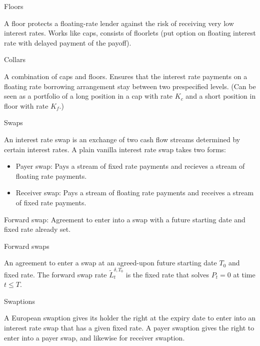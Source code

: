 \begin{description}
\item[Floors] 
\end{description}
A floor protects a floating-rate lender against the risk of receiving very low interest
rates. Works like caps, consists of floorlets (put option on floating interest rate with delayed
payment of the payoff).

\begin{description}
\item[Collars] 
\end{description}
A combination of caps and floors. Ensures that the interest rate payments on a floating
rate borrowing arrangement stay between two prespecified levels. (Can be seen as a portfolio of a
long position in a cap with rate $K_{c}$ and a short position in floor with rate $K_{f}$.)

\begin{description}
\item[Swaps] 
\end{description}
An interest rate swap is an exchange of two cash flow streams determined by certain interest
rates. A plain vanilla interest rate swap takes two forms:

\begin{itemize}
  \item Payer swap: Pays a stream of fixed rate payments and recieves a stream of floating rate
    payments.
  \item Receiver swap: Pays a stream of floating rate payments and receives a stream of fixed rate
    payments.
\end{itemize}
Forward swap: Agreement to enter into a swap with a future starting date and fixed rate already
set.

\begin{description}
\item[Forward swaps] 
\end{description}
An agreement to enter a swap at an agreed-upon future starting date $T_0$ and fixed rate. The
forward swap rate $\tilde{L}_t^{\delta, T_0}$ is the fixed rate that solves $P_t = 0$ at time $t\le
T$.

\begin{description}
\item[Swaptions] 
\end{description}
A European swaption gives its holder the right at the expiry date to enter into an
interest rate swap that has a given fixed rate. A payer swaption gives the right to enter into a
payer swap, and likewise for receiver swaption.

